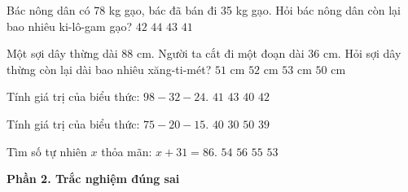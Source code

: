\begin{ex} %
Bác nông dân có 78 kg gạo, bác đã bán đi 35 kg gạo. Hỏi bác nông dân còn lại bao nhiêu ki-lô-gam gạo?
\choice
{$42$}
{$44$}
{\True $43$}
{$41$}
\end{ex}

\begin{ex} %
Một sợi dây thừng dài 88 cm. Người ta cắt đi một đoạn dài 36 cm. Hỏi sợi dây thừng còn lại dài bao nhiêu xăng-ti-mét?
\choice
{$51\text{ cm}$}
{\True $52\text{ cm}$}
{$53\text{ cm}$}
{$50\text{ cm}$}
\end{ex}

\begin{ex} %
Tính giá trị của biểu thức: $98 - 32 - 24$.
\choice
{$41$}
{$43$}
{$40$}
{\True $42$}
\end{ex}

\begin{ex} %
Tính giá trị của biểu thức: $75 - 20 - 15$.
\choice
{\True $40$}
{$30$}
{$50$}
{$39$}
\end{ex}

\begin{ex} %
Tìm số tự nhiên $x$ thỏa mãn: $x + 31 = 86$.
\choice
{$54$}
{$56$}
{\True $55$}
{$53$}
\end{ex}

\textbf{Phần 2. Trắc nghiệm đúng sai}

